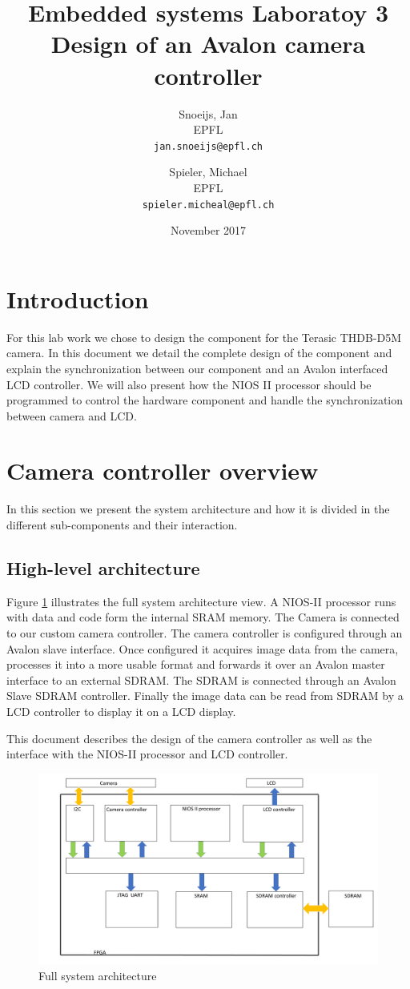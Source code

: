 \documentclass{article}
\title{Embedded systems Laboratoy 3 \\
        Design of an Avalon camera controller}
\author{
  Snoeijs, Jan\\
  EPFL\\
  \texttt{jan.snoeijs@epfl.ch}
  \and
  Spieler, Michael\\
  EPFL\\
  \texttt{spieler.micheal@epfl.ch}
  }
\date{November 2017}
\begin{document}
\maketitle

\section{Introduction}

For this lab work we chose to design the component for the Terasic THDB-D5M camera. In this document we detail the complete design of the component and explain the synchronization between our component and an Avalon interfaced LCD controller. We will also present how the NIOS II processor should be programmed to control the hardware component and handle the synchronization between camera and LCD.

\section{Camera controller overview}

In this section we present the system architecture and how it is divided in the different sub-components and their interaction.

\subsection{High-level architecture}
Figure \ref{fig:full_system} illustrates the full system architecture view. A NIOS-II processor runs with data and code form the internal SRAM memory. The Camera is connected to our custom camera controller. The camera controller is configured through an Avalon slave interface. Once configured it acquires image data from the camera, processes it into a more usable format and forwards it over an Avalon master interface to an external SDRAM. The SDRAM is connected through an Avalon Slave SDRAM controller. Finally the image data can be read from SDRAM by a LCD controller to display it on a LCD display.

This document describes the design of the camera controller as well as the interface with the NIOS-II processor and LCD controller.

\begin{figure}[H]
\centering
\includegraphics[scale=0.25]{full_system.png}
\caption{Full system architecture}
\label{fig:full_system}
\end{figure}
\end{document}
